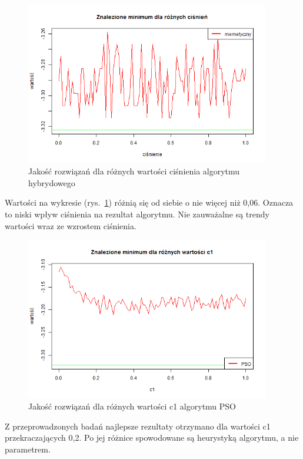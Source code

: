 \documentclass[11pt, a4paper]{article}
\newcommand{\fbi}{\leavevmode{\parindent=1em\indent}}
\begin{document}
\begin{figure}[H]
	\centering
	\includegraphics[width=0.95\textwidth]{./assets/Hartman6pressel.png}
	\caption{Jakość rozwiązań dla różnych wartości ciśnienia algorytmu hybrydowego}
	\label{fig:hybridpressel}
\end{figure}

\fbi
Wartości na wykresie (rys.~\ref{fig:hybridpressel}) różnią się od siebie o nie więcej niż 0,06. Oznacza to niski wpływ ciśnienia na rezultat algorytmu. Nie zauważalne są trendy wartości wraz ze wzrostem ciśnienia.


\begin{figure}[H]
	\centering
	\includegraphics[width=0.95\textwidth]{./assets/Hartman6c1.png}
	\caption{Jakość rozwiązań dla różnych wartości c1 algorytmu PSO}
	\label{fig:psoc1}
\end{figure}

\fbi
Z przeprowadzonych badań najlepsze rezultaty otrzymano dla wartości c1 przekraczających 0,2. Po jej różnice spowodowane są heurystyką algorytmu, a nie parametrem.
\end{document}
